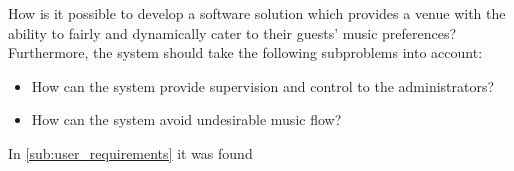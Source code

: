 How is it possible to develop a software solution which provides a venue with the ability to fairly and dynamically cater to their guests' music preferences?\\
Furthermore, the system should take the following subproblems into account:
\begin{itemize}
\item How can the system provide supervision and control to the administrators?
\item How can the system avoid undesirable music flow?
\end{itemize}

In \cref{sub:user_requirements} it was found 